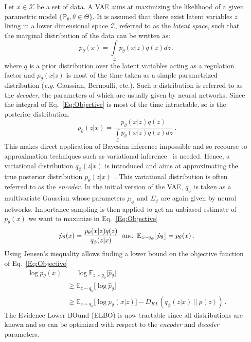 \documentclass[10pt,journal,compsoc]{IEEEtran}
\begin{document}
Let $x \in \mathcal{X}$ be a set of data. A VAE aims at maximizing the likelihood of a given parametric model $\{\mathbb{P}_{\theta}, \theta \in \Theta\}$. It is assumed that there exist latent variables $z$ living in a lower dimensional space $\mathcal{Z}$, referred to as the \emph{latent space}, such that the marginal distribution of the data can be written as:
\begin{equation}\label{Eq:Objective}
    p_{\theta}(x) = \int \limits _{\mathcal{Z}} p_{\theta}(x|z)q(z) dz \,,
\end{equation}
where $q$ is a prior distribution over the latent variables acting as a regulation factor and $p_{\theta}(x|z)$ is most of the time taken as a simple parametrized distribution (\textit{e.g.} Gaussian, Bernoulli, etc.). Such a distribution is referred to as the \textit{decoder}, the parameters of which are usually given by neural networks. Since the integral of Eq.~\eqref{Eq:Objective} is most of the time intractable, so is the posterior distribution:
\[
p_{\theta}(z|x) = \frac{p_{\theta}(x|z) q(z)}{\int \limits_{\mathcal{Z}} p_{\theta}(x|z) q(z) dz}\,.
\]
This makes direct application of Bayesian inference impossible and so recourse to approximation techniques such as variational inference~\cite{jordan_introduction_1999} is needed. Hence, a variational distribution $q_{\phi}(z|x)$ is introduced and aims at approximating the true posterior distribution $p_{\theta}(z|x)$~\cite{kingma_auto-encoding_2014}. This variational distribution is often referred to as the \emph{encoder}. In the initial version of the VAE, $q_{\phi}$ is taken as a multivariate Gaussian whose parameters $\mu_{\phi}$ and $\Sigma_{\phi}$ are again given by neural networks. Importance sampling is then applied to get an unbiased estimate of  $p_{\theta}(x)$ we want to maximize in Eq.~\eqref{Eq:Objective}
\begin{equation}\label{eq: log-like estimate vae}
    \hat{p}_{\theta}(x) = \frac{p_{\theta}(x|z)q(z)}{q_{\phi}(z|x)} \hspace{2mm} \text{and} \hspace{2mm} \mathbb{E}_{z \sim q_{\phi}}\big[\hat{p}_{\theta}\big] = p_{\theta}(x)\,.
\end{equation}
Using Jensen's inequality allows finding a lower bound on the objective function of Eq.~\eqref{Eq:Objective}
\begin{equation}\label{eq: ELBO}
     \begin{aligned}
      \log p_{\theta}(x) &= \log \mathbb{E}_{z \sim q_{\phi}}\big[\hat{p}_{\theta}\big]\\
                         &\geq \mathbb{E}_{z \sim q_{\phi}}\big[\log \hat{p}_{\theta}\big]\\
                         & \geq \mathbb{E}_{z \sim q_{\phi}}\big[ \log p_{\theta}(x|z) \big] - D_{KL}(q_{\phi}(z|x)\lVert p(z))\,.
     \end{aligned}
\end{equation}
The Evidence Lower BOund (ELBO) is now tractable since  all distributions are known and so can be optimized with respect to the \textit{encoder} and \textit{decoder} parameters. 
\end{document}
